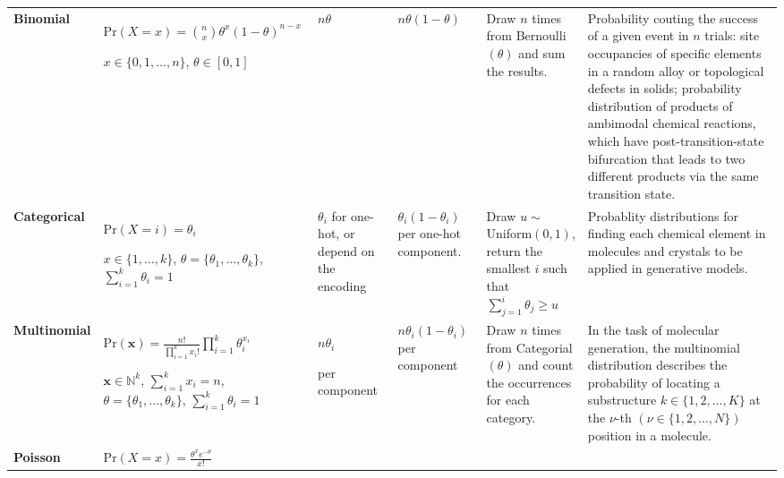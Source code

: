 \begin{longtable}{p{2cm}
    >{\raggedright\arraybackslash}p{3cm}
    >{\raggedright\arraybackslash}p{1.5cm}
    >{\raggedright\arraybackslash}p{1.5cm}
    >{\raggedright\arraybackslash}p{3cm}
    p{6cm}}
\textbf{\footnotesize{Binomial}}  
& \footnotesize{$\mbox{Pr}(X=x)=\binom{n}{x}\theta^{x}(1-\theta)^{n-x}$

$x \in \{0,1,\ldots,n\}$, $\theta\in[0,1]$} 
& \footnotesize{$n\theta$} 
& \footnotesize{$n\theta(1-\theta)$} 
& \footnotesize{Draw $n$ times from Bernoulli$(\theta)$ and sum the results.} 
&\footnotesize{Probability couting the success of a given event in $n$ trials: site occupancies of specific elements in a random alloy\cite{robouch2014complex} or topological defects in solids;\cite{gomez2020full} probability distribution of products of ambimodal chemical reactions, which have post-transition-state bifurcation that leads to two different products via the same transition state.\cite{tyukina2024binomial} } \\

\textbf{\footnotesize{Categorical}} 
&\footnotesize{$\mbox{Pr}(X=i)=\theta_i$

$x \in \{1,\ldots,k\}$, $\theta = \{\theta_1,\ldots,\theta_k\}$, $\sum_{i=1}^{k} \theta_i = 1$}
& \footnotesize{$\theta_i$ for one-hot, or depend on the encoding}
& \footnotesize{$\theta_i (1-\theta_i)$ per one-hot component.}
& \footnotesize{Draw $u\sim$Uniform$(0,1)$, return the smallest $i$ such that $\sum_{j=1}^{i} \theta_j \geq u$}
& \footnotesize{Probablity distributions for finding each chemical element in molecules and crystals to be applied in generative models.\cite{le2023navigating,cao2025space}} \\

\textbf{\footnotesize{Multinomial}}
& \footnotesize{$\mbox{Pr}(\bm{x})=\frac{n!}{\prod_{i=1}^{k} x_i!} \prod_{i=1}^{k} \theta_i^{x_i}$

$\bm{x} \in \mathbb{N}^{k}$, $\sum_{i=1}^{k} x_i = n$, $\theta = \{\theta_1,\ldots,\theta_k\}$, $\sum_{i=1}^{k} \theta_i = 1$}
&   \footnotesize{$n \theta_i$ 

per component}
&   \footnotesize{$n \theta_i (1-\theta_i)$ per component}
&   \footnotesize{Draw $n$ times from Categorial$(\theta)$ and count the occurrences for each category.}
& \footnotesize{In the task of molecular generation, the multinomial distribution describes the probability of locating a substructure $k\in\{1,2,\ldots,K\}$ at the $\nu$-th $(\nu\in \{1,2,\ldots,N\})$ position in a molecule.\cite{fu2021mimosa}} \\

\textbf{\footnotesize{Poisson}}
& \footnotesize{$\mbox{Pr}(X=x)=\frac{\theta^{x} e^{-\theta}}{x!}$

}
\end{longtable}
